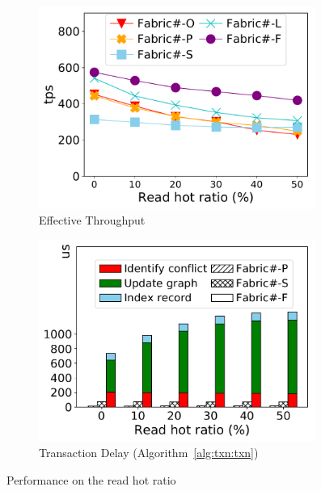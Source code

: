 \begin{figure}[t]
	\centering
    \begin{subfigure}{0.45\textwidth}
      \includegraphics[width=0.99\textwidth]{chart/txn/complex_readhot_thruput.pdf}
      \caption{Effective Throughput}
      \label{chart:txn:readhot:thruput}
    \end{subfigure}
    \begin{subfigure}{0.45\textwidth}
      \includegraphics[width=0.99\textwidth]{chart/txn/complex_readhot_txn_delay.pdf}
      \caption{Transaction Delay (Algorithm~\ref{alg:txn:txn})}
      \label{chart:txn:readhot:delay}
    \end{subfigure}
    \caption{Performance on the read hot ratio}
    \label{chart:txn:readhot}
\end{figure}
